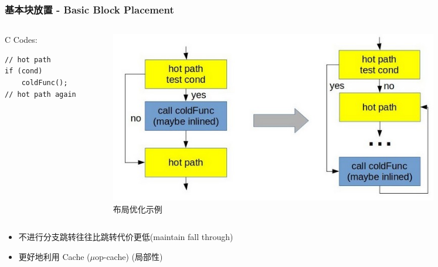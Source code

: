 \begin{frame}[fragile]
\frametitle{基本块放置 - Basic Block Placement}

    \begin{columns}
        \begin{column}{0.3\textwidth}
            \centering
            C Codes:
            \begin{lstlisting}
// hot path
if (cond)
    coldFunc();
// hot path again\end{lstlisting}
        \end{column}
        \begin{column}{0.65\textwidth}
            \begin{figure}
                \centering
                \includegraphics[width=0.86\textwidth]{images/hot_cold_placement.jpg}
                \caption{布局优化示例}
            \end{figure}
        \end{column}
    \end{columns}
    \begin{itemize}
        \item 不进行分支跳转往往比跳转代价更低(maintain fall through)
        \item 更好地利用 Cache ($\mu$op-cache) (局部性)
    \end{itemize}

\end{frame}

